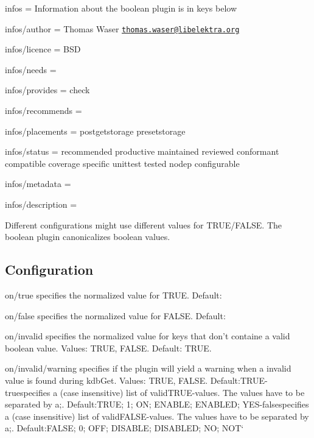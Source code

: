
\begin{DoxyItemize}
\item infos = Information about the boolean plugin is in keys below
\item infos/author = Thomas Waser \href{mailto:thomas.waser@libelektra.org}{\tt thomas.\+waser@libelektra.\+org}
\item infos/licence = B\+S\+D
\item infos/needs =
\item infos/provides = check
\item infos/recommends =
\item infos/placements = postgetstorage presetstorage
\item infos/status = recommended productive maintained reviewed conformant compatible coverage specific unittest tested nodep configurable
\item infos/metadata =
\item infos/description =
\end{DoxyItemize}

Different configurations might use different values for {\ttfamily T\+R\+U\+E}/{\ttfamily F\+A\+L\+S\+E}. The {\ttfamily boolean} plugin canonicalizes boolean values.

\subsection*{Configuration}


\begin{DoxyItemize}
\item {\ttfamily on/true} specifies the normalized value for {\ttfamily T\+R\+U\+E}. Default\+: {}
\item {\ttfamily on/false} specifies the normalized value for {\ttfamily F\+A\+L\+S\+E}. Default\+: {}
\item {\ttfamily on/invalid} specifies the normalized value for keys that don't containe a valid boolean value. Values\+: {\ttfamily T\+R\+U\+E}, {\ttfamily F\+A\+L\+S\+E}. Default\+: {\ttfamily T\+R\+U\+E}.
\item {\ttfamily on/invalid/warning} specifies if the plugin will yield a warning when a invalid value is found during kdb\+Get. Values\+: {\ttfamily T\+R\+U\+E}, {\ttfamily F\+A\+L\+S\+E}. {\ttfamily Default\+:}T\+R\+U\+E{\ttfamily  -\/}true{\ttfamily specifies a (case insensitive) list of valid}T\+R\+U\+E{\ttfamily -\/values. The values have to be separated by a};{\ttfamily . Default\+:}T\+R\+U\+E; 1; O\+N; E\+N\+A\+B\+L\+E; E\+N\+A\+B\+L\+E\+D; Y\+E\+S{\ttfamily  -\/}false{\ttfamily specifies a (case insensitive) list of valid}F\+A\+L\+S\+E{\ttfamily -\/values. The values have to be separated by a};{\ttfamily . Default\+:}F\+A\+L\+S\+E; 0; O\+F\+F; D\+I\+S\+A\+B\+L\+E; D\+I\+S\+A\+B\+L\+E\+D; N\+O; N\+O\+T` 
\end{DoxyItemize}
